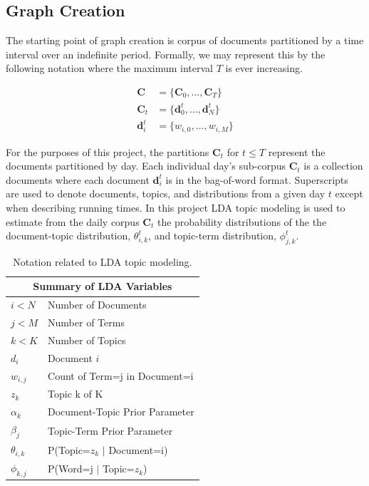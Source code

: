 \documentclass[10pt]{article}
\begin{document}
\subsection {Graph Creation}
The starting point of graph creation is corpus of documents partitioned by a time interval over an indefinite period.   Formally, we may represent this by the following notation where the maximum interval $T$ is ever increasing.  

\begin{align}
\mathbf{C} &= \{ \mathbf{C}_0, \dots, \mathbf{C}_T \} \\
\mathbf{C}_t &= \{\mathbf{d}_0^t, \dots, \mathbf{d}_N^t \} \\
\mathbf{d}_i^t &= \{ w_{i,0}, \dots, w_{i,M} \}
\end{align}

For the purposes of this project, the partitions $\mathbf{C}_t$ for $t \le T$ represent the documents partitioned by day.  Each individual day's sub-corpus $\mathbf{C}_t$ is a collection documents where each document $\mathbf{d}_i^t$ is in the bag-of-word format.  Superscripts are used to denote documents, topics, and distributions from a given day $t$ except when describing running times.  In this project LDA topic modeling is used to estimate from the daily corpus $\mathbf{C}_t$ the probability distributions of the the document-topic distribution, $\theta_{i,k}^t$, and topic-term distribution, $\phi_{j,k}^t$.

\begin{table}
\begin{center}
\begin{tabular}{|l|l|}
  \hline
  \multicolumn{2}{|c|}{Summary of LDA Variables} \\
  \hline
  $i < N$ & Number of Documents \\
  $j < M$ & Number of Terms \\
  $k < K$ & Number of Topics \\
  $d_i$ & Document $i$ \\
  $w_{i, j}$ & Count of Term=j in Document=i \\
  $z_k$ & Topic k of K \\
  \emph{$\alpha_k$} & Document-Topic Prior Parameter\\
  \emph{$\beta_j$} & Topic-Term Prior Parameter \\
  $\theta_{i,k}$ & P(Topic=$z_k$ $\vert$ Document=i) \\
  $\phi_{k,j}$ & P(Word=j $\vert$ Topic=$z_k$) \\
  \hline
\end{tabular}
\caption{Notation related to LDA topic modeling.}
\end{center}
\end{table}
\end{document}
